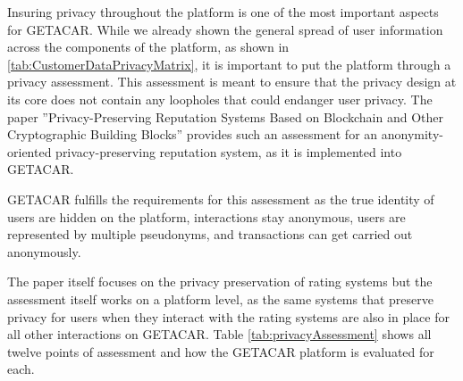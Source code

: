 Insuring privacy throughout the platform is one of the most important aspects for GETACAR. While we already shown the general spread of user information across the components of the platform, as shown in \ref{tab:CustomerDataPrivacyMatrix}, it is important to put the platform through a privacy assessment. This assessment is meant to ensure that the privacy design at its core does not contain any loopholes that could endanger user privacy. The paper ''Privacy-Preserving Reputation Systems Based on Blockchain and Other Cryptographic Building Blocks'' provides such an assessment for an anonymity-oriented privacy-preserving reputation system, as it is implemented into GETACAR. 

GETACAR fulfills the requirements for this assessment as the true identity of users are hidden on the platform, interactions stay anonymous, users are represented by multiple pseudonyms, and transactions can get carried out anonymously. 

The paper itself focuses on the privacy preservation of rating systems but the assessment itself works on a platform level, as the same systems that preserve privacy for users when they interact with the rating systems are also in place for all other interactions on GETACAR. Table \ref{tab:privacyAssessment} shows all twelve  points of assessment and how the GETACAR platform is evaluated for each.


